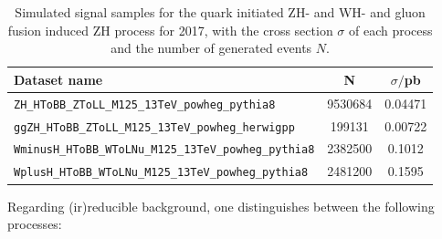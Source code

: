 \begin{table}[h!]
	\centering
	\begin{tabular}{lS[table-format=8.0]S[table-format=1.6]}
		Dataset name&{N}&$\sigma/$\si{\pico\barn} \\
		\midrule
		\verb|ZH_HToBB_ZToLL_M125_13TeV_powheg_pythia8|&9530684 &0.04471\\
		\verb|ggZH_HToBB_ZToLL_M125_13TeV_powheg_herwigpp|& 199131&0.00722\\
		\midrule
		\verb|WminusH_HToBB_WToLNu_M125_13TeV_powheg_pythia8|&2382500&0.1012\\
		\verb|WplusH_HToBB_WToLNu_M125_13TeV_powheg_pythia8|&2481200&0.1595\\
	\end{tabular}
	\caption{Simulated signal samples for the quark initiated ZH- and WH- and gluon fusion induced ZH process for 2017, with the cross section $\sigma$ of each process and the number of generated events $N$.}
	\label{tab:signal_datasets}
\end{table}

Regarding (ir)reducible background, one distinguishes between the following processes:

